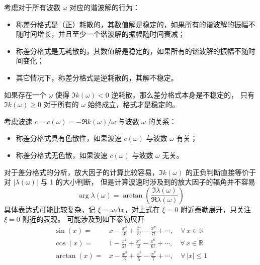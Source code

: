 \begin{definition}[差分格式的耗散性]
    考虑对于所有波数 $\omega$ 对应的谐波解的行为：
    \begin{itemize}
        \item 称差分格式是（正）耗散的，其数值解是稳定的，如果所有的谐波解的振幅不随时间增长，并且至少一个谐波解的振幅随时间衰减；
        \item 称差分格式是无耗散的，其数值解是稳定的，如果所有的谐波解的振幅不随时间变化；
        \item 其它情况下，称差分格式是逆耗散的，其解不稳定。
    \end{itemize}
\end{definition}

\begin{remark}
    如果存在一个 $\omega$ 使得 $\Im k(\omega) < 0$ 逆耗散，那么差分格式本身是不稳定的，
    只有 $\Im k(\omega) \ge 0$ 对于所有的 $\omega$ 始终成立，格式才是稳定的。
\end{remark}

\begin{definition}[差分格式的色散性]
    考虑波速 $c = c(\omega) = - \Re k(\omega) / \omega$ 与波数 $\omega$ 的关系：
    \begin{itemize}
        \item 称差分格式具有色散性，如果波速 $c(\omega)$ 与波数 $\omega$ 有关；
        \item 称差分格式无色散，如果波速 $c(\omega)$ 与波数 $\omega$ 无关。
    \end{itemize}
\end{definition}

对于差分格式的分析，放大因子的计算比较容易，$\Im k(\omega)$ 的正负判断直接等价于对 $|\lambda(\omega)|$ 与 1 的大小判断，
但是计算波速时涉及到的放大因子的辐角并不容易
\[
    \arg \lambda(\omega) = \arctan \left(\frac{\Im \lambda(\omega)}{\Re \lambda(\omega)}\right)
\]
具体表达式可能比较复杂，记 $\xi = \omega \Delta x$，对上式在 $\xi = 0$ 附近泰勒展开，只关注 $\xi = 0$ 附近的表现。
可能涉及到如下泰勒展开
\begin{align*}
    \sin(x) ={}    & x - \frac{x^3}{3!} + \frac{x^5}{5!} - \frac{x^7}{7!} + \cdots, \quad \forall\, x \in \mathbb{R}  \\
    \cos(x) ={}    & 1 - \frac{x^2}{2!} + \frac{x^4}{4!} - \frac{x^6}{6!} + \cdots, \quad \forall\, x  \in \mathbb{R} \\
    \arctan(x) ={} & x - \frac{x^3}{3} + \frac{x^5}{5} - \frac{x^7}{7} + \cdots, \quad \forall\, |x| \le 1
\end{align*}

